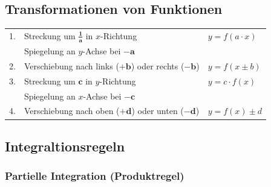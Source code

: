 \subsection{Transformationen von Funktionen}	

\begin{tabular}{lll}
    1.  & Streckung um $\bm{\frac{1}{a}}$ in $x$-Richtung               & $y = f(a \cdot x)$    \\
        & Spiegelung an $y$-Achse bei $\bm{-a}$                                                 \\
    2.  & Verschiebung nach links ($\bm{+b}$) oder rechts ($\bm{-b}$)   & $y = f(x \pm b)$      \\
    3.  & Streckung um $\bm{c}$ in $y$-Richtung                         & $y = c \cdot f(x)$    \\
        & Spiegelung an $x$-Achse bei $\bm{-c}$                                                 \\
    4.  & Verschiebung nach oben ($\bm{+d}$) oder unten ($\bm{-d}$)     & $y = f(x) \pm d $ 
\end{tabular}
    
    
\subsection{Integraltionsregeln}





\subsubsection{Partielle Integration (Produktregel)}
\vspace{-1em}

